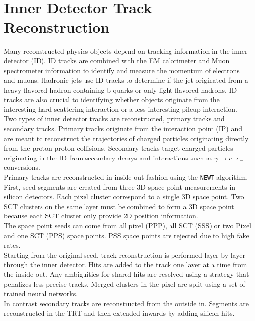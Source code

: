 \section{Inner Detector Track Reconstruction}
\label{sec:reco:IDtrack}

\indent  Many reconstructed physics objects depend on tracking information in the inner detector (ID).  ID tracks are combined with the EM calorimeter and Muon spectrometer information to identify and measure the momentum of electrons and muons.  Hadronic jets use ID tracks to determine if the jet originated from a heavy flavored hadron containing b-quarks or only light flavored hadrons.  ID tracks are also crucial to identifying whether objects originate from the interesting hard scattering interaction or a less interesting pileup interaction.\\

\indent Two types of inner detector tracks are reconstructed, primary tracks and secondary tracks.  Primary tracks originate from the interaction point (IP) and are meant to reconstruct the trajectories of charged particles originating directly from the proton proton collisions.  Secondary tracks target charged particles originating in the ID from secondary decays and interactions such as $\gamma \rightarrow e^{+}e_{-}$ conversions.  \\

\indent Primary tracks are reconstructed in inside out fashion using the {\tt NEWT} algorithm.\cite{NEWT}  First, seed segments are created from three 3D space point measurements in silicon detectors.  Each pixel cluster correspond to a single 3D space point.  Two SCT clusters on the same layer must be combined to form a 3D space point because each SCT cluster only provide 2D position information.  \\

\indent The space point seeds can come from all pixel (PPP), all SCT (SSS) or two Pixel and one SCT (PPS) space points.  PSS space points are rejected due to high fake rates.  \\

\indent Starting from the original seed, track reconstruction is performed layer by layer through the inner detector. Hits are added to the track one layer at a time from the inside out.  Any ambiguities for shared hits are resolved using a strategy that penalizes less precise tracks.  Merged clusters in the pixel are split using a set of trained neural networks. \\

\indent In contrast secondary tracks are reconstructed from the outside in.  Segments are reconstructed in the TRT and then extended inwards by adding silicon hits. \\